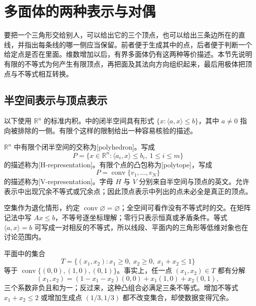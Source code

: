 
% 
% 

\section{多面体的两种表示与对偶}
\label{g1:sec:0303}

要把一个三角形交给别人，可以给出它的三个顶点，也可以给出三条边所在的直线，并指出每条线的哪一侧应当保留。前者便于生成其中的点，后者便于判断一个给定点是否在里面。维数增加以后，有界多面体仍有这两种等价描述。本节先说明有限的不等式为何产生有限顶点，再把面及其法向方向组织起来，最后用极体把顶点与不等式相互转换。

\subsection{半空间表示与顶点表示}
\label{g1:subsec:0303:01}

以下使用 \(\mathbb R^n\) 的标准内积。中的闭半空间具有形式 \(\{x:\langle a,x\rangle\le b\}\)，其中 \(a\ne0\) 指向被排除的一侧。有限个这样的限制给出一种容易核验的描述。

\begin{definition}
	\label{g1:def:polyhedron-polytope}
	\(\mathbb R^n\) 中有限个闭半空间的交称为[polyhedron]。写成
	\[
		P=\{x\in\mathbb R^n:\langle a_i,x\rangle\le b_i,\ 1\le i\le m\}
	\]
	的描述称为[H-representation]。有限个点的凸包称为[polytope]，写成
	\[
		P=\operatorname{conv}\{v_1,\ldots,v_N\}
	\]
	的描述称为[V-representation]。字母 \(H\) 与 \(V\) 分别来自半空间与顶点的英文。允许表示中出现冗余不等式或冗余点；因此顶点表示中列出的点未必全是真正的顶点。
\end{definition}

空集作为退化情形，约定 \(\operatorname{conv}\varnothing=\varnothing\)；全空间可看作没有不等式时的交。在矩阵记法中写 \(Ax\le b\)，不等号逐坐标理解；零行只表示恒真或矛盾条件。等式 \(\langle a,x\rangle=b\) 可写成一对相反的不等式，所以线段、平面内的三角形等低维对象也在讨论范围内。

\begin{example}
	\label{g1:exm:triangle-hv}
	平面中的集合
	\[
		T=\{(x_1,x_2):x_1\ge0,\ x_2\ge0,\ x_1+x_2\le1\}
	\]
	等于 \(\operatorname{conv}\{(0,0),(1,0),(0,1)\}\)。事实上，任一点 \((x_1,x_2)\in T\) 都有分解
	\[
		(x_1,x_2)=(1-x_1-x_2)(0,0)+x_1(1,0)+x_2(0,1),
	\]
	三个系数非负且和为一；反过来，这种凸组合必满足三条不等式。增加不等式 \(x_1+x_2\le2\) 或增加生成点 \((1/3,1/3)\) 都不改变集合，却使数据变得冗余。
\end{example}

